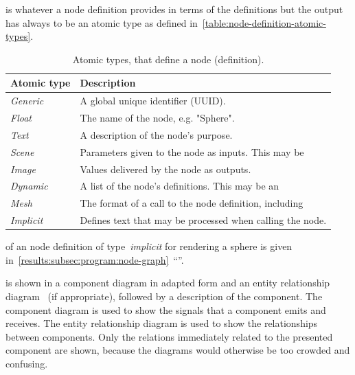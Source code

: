 \documentclass[%
    a4paper,    %
    justified,  %
    nobib,      %
    openany     %
]{tufte-book}
\makeatletter
\renewcommand{\label}[1]{\@tufte@label{##1}}%
\newcommand{\ra}[1]{\renewcommand{\arraystretch}{#1}}
\makeatother
\begin{document}
 is whatever a node definition provides in terms of the
definitions but the output has always to be an atomic type as defined
in~\autoref{table:node-definition-atomic-types}.

\begin{table}\centering
  \ra{1.3}
  \begin{tabularx}{\textwidth}{@{}lX@{}}
    \toprule
    \textbf{Atomic type} & \textbf{Description}                                         \\
    \hline
    \textit{Generic}     & A global unique identifier (UUID\protect\footnotemark[1]{}). \\
    \textit{Float}       & The name of the node, e.g. "Sphere".                         \\
    \textit{Text}        & A description of the node's purpose.                         \\
    \textit{Scene}       & Parameters given to the node as inputs. This may be          \\
    \textit{Image}       & Values delivered by the node as outputs.                     \\
    \textit{Dynamic}     & A list of the node's definitions. This may be an             \\
    \textit{Mesh}        & The format of a call to the node definition, including       \\
    \textit{Implicit}    & Defines text that may be processed when calling the node.    \\
    \bottomrule
  \end{tabularx}
  \caption{Atomic types, that define a node (definition).}
  \label{lst:node-definition-atomic-types}
\end{table}

 of an node definition of type~\emph{implicit} for
rendering a sphere is given
in~\cref{results:subsec:program:node-graph}~\enquote{}.

 is shown in a component
diagram in adapted form \cite[pp. 653 -- 654]{larman-applying-2004} and an
entity relationship diagram~\cite[pp. 501 ff.]{larman-applying-2004} (if
appropriate), followed by a description of the component. The component diagram
is used to show the signals that a component emits and receives. The entity
relationship diagram is used to show the relationships between components. Only
the relations immediately related to the presented component are shown, because
the diagrams would otherwise be too crowded and confusing.
\end{document}
